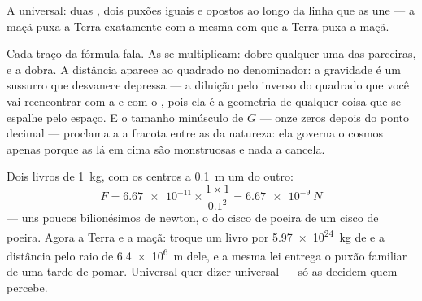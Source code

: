 \begin{omfigure}

{\small A  universal: duas , dois puxões iguais e
opostos ao longo da linha que as une --- a maçã puxa a Terra
exatamente com a mesma  com que a Terra puxa a maçã.}
\end{omfigure}

\begin{example}\label{ex:g9:gravitation:reading}
Cada traço da fórmula fala. As  se multiplicam: dobre qualquer
uma das parceiras, e a  dobra. A distância aparece ao quadrado
no denominador: a gravidade é um sussurro que desvanece depressa ---
a diluição pelo inverso do quadrado que você vai reencontrar com a
 e com o , pois ela é a geometria de qualquer coisa que se
espalhe pelo espaço. E o tamanho minúsculo de $G$ --- onze zeros
depois do ponto decimal --- proclama a  a fracota entre as 
da natureza: ela governa o cosmos apenas porque as  lá em cima
são monstruosas e nada a cancela.
\end{example}

\begin{example}\label{ex:g9:gravitation:books}
Dois livros de \qty{1}{kg}, com os centros a \qty{0.1}{m} um do
outro:
\[
F = \num{6.67e-11} \times \frac{1 \times 1}{0.1^2}
= \qty{6.67e-9}{N}
\]
--- uns poucos bilionésimos de newton, o  do cisco de poeira de
um cisco de poeira. Agora a Terra e a maçã: troque um livro por
\qty{5.97e24}{kg} de  e a distância pelo raio de
\qty{6.4e6}{m} dele, e a mesma lei entrega o puxão familiar de uma
tarde de pomar. Universal quer dizer universal --- só as 
decidem quem percebe.
\end{example}

